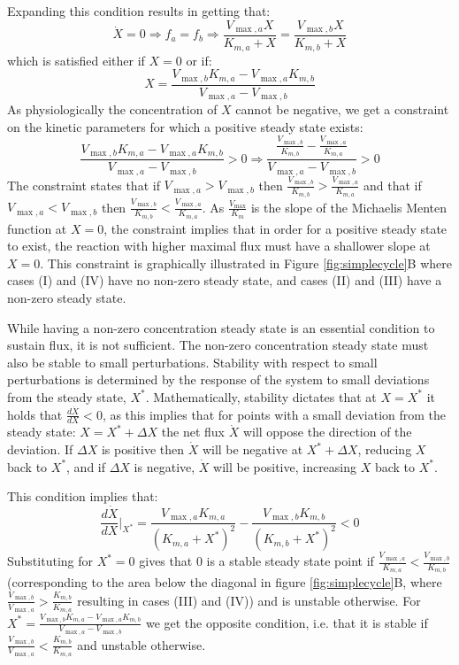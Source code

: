 \documentclass[a4page,notitlepage]{article}
\begin{document}
    Expanding this condition results in getting that:
    \begin{equation*}
      \dot X = 0 \Rightarrow f_a = f_b \Rightarrow \frac{V_{\max,a}X}{K_{m,a}+X}=\frac{V_{\max,b}X}{K_{m,b}+X}
    \end{equation*}
    which is satisfied either if $X=0$ or if:
    \begin{equation*}
      X=\frac{V_{\max,b}K_{m,a}-V_{\max,a}K_{m,b}}{V_{\max,a}-V_{\max,b}}
    \end{equation*}
    As physiologically the concentration of $X$ cannot be negative, we get a constraint on the kinetic parameters for which a positive steady state exists:
    \begin{equation*}
      \frac{V_{\max,b}K_{m,a}-V_{\max,a}K_{m,b}}{V_{\max,a}-V_{\max,b}}>0 \Rightarrow \frac{\frac{V_{\max,b}}{K_{m,b}}-\frac{V_{\max,a}}{K_{m,a}}}{V_{\max,a}-V_{\max,b}}>0
    \end{equation*}
    The constraint states that if $V_{\max,a}>V_{\max,b}$ then $\frac{V_{\max,b}}{K_{m,b}}>\frac{V_{\max,a}}{K_{m,a}}$ and that if $V_{\max,a}<V_{\max,b}$ then $\frac{V_{\max,b}}{K_{m,b}}<\frac{V_{\max,a}}{K_{m,a}}$.
    As $\frac{V_{\max}}{K_m}$ is the slope of the Michaelis Menten function at $X=0$, the constraint implies that in order for a positive steady state to exist, the reaction with higher maximal flux must have a shallower slope at $X=0$.
    This constraint is graphically illustrated in Figure \ref{fig:simplecycle}B where cases (I) and (IV) have no non-zero steady state, and cases (II) and (III) have a non-zero steady state.

    While having a non-zero concentration steady state is an essential condition to sustain flux, it is not sufficient.
    The non-zero concentration steady state must also be stable to small perturbations.
    Stability with respect to small perturbations is determined by the response of the system to small deviations from the steady state, $X^*$.
    Mathematically, stability dictates that at $X=X^*$ it holds that $\frac{d\dot X}{dX} <0$, as this  implies that for points with a small deviation from the steady state: $X = X^*+\Delta X$ the net flux $\dot X$ will oppose the direction of the deviation.
    If $\Delta X$ is positive then $\dot X$ will be negative at $X^*+\Delta X$, reducing $X$ back to $X^*$, and if $\Delta X$ is negative, $\dot X$ will be positive, increasing $X$ back to $X^*$.

    This condition implies that:
    \begin{equation*}
      \frac{d\dot X}{dX}\Big\vert_{X^*} = \frac{V_{\max,a}K_{m,a}}{(K_{m,a}+X^*)^2}-\frac{V_{\max,b}K_{m,b}}{(K_{m,b}+X^*)^2}<0
    \end{equation*}
    Substituting for $X^*=0$ gives that $0$ is a stable steady state point if $\frac{V_{\max,a}}{K_{m,a}}<\frac{V_{\max,b}}{K_{m,b}}$ (corresponding to the area below the diagonal in figure \ref{fig:simplecycle}B, where $\frac{V_{\max,b}}{V_{\max,a}}>\frac{K_{m,b}}{K_{m,a}}$ resulting in cases (III) and (IV)) and is unstable otherwise.
    For $X^*=\frac{V_{\max,b}K_{m,a}-V_{\max,a}K_{m,b}}{V_{\max,a}-V_{\max,b}}$ we get the opposite condition, i.e. that it is stable if $\frac{V_{\max,b}}{V_{\max,a}}<\frac{K_{m,b}}{K_{m,a}}$ and unstable otherwise.
    
\end{document}

